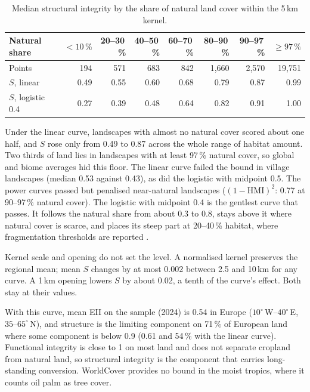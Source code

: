\documentclass[11pt,a4paper]{article}
\newcommand{\HMI}{\mathrm{HMI}}
\begin{document}
\begin{table}[H]
\centering\small
\caption{Median structural integrity by the share of natural land cover within the 5\,km kernel.}
\begin{tabular}{lrrrrrrr}
\toprule
Natural share & $<10\,\%$ & 20--30\,\% & 40--50\,\% & 60--70\,\% & 80--90\,\% & 90--97\,\% & $\ge 97\,\%$ \\
\midrule
Points & 194 & 571 & 683 & 842 & 1,660 & 2,570 & 19,751 \\
$S$, linear & 0.49 & 0.55 & 0.60 & 0.68 & 0.79 & 0.87 & 0.99 \\
$S$, logistic 0.4 & 0.27 & 0.39 & 0.48 & 0.64 & 0.82 & 0.91 & 1.00 \\
\bottomrule
\end{tabular}
\end{table}

Under the linear curve, landscapes with almost no natural cover scored about one half, and $S$ rose
only from 0.49 to 0.87 across the whole range of habitat amount. Two thirds of land lies in
landscapes with at least 97\,\% natural cover, so global and biome averages hid this floor. The
linear curve failed the bound in village landscapes (median 0.53 against 0.43), as did the
logistic with midpoint 0.5. The power curves passed but penalised near-natural landscapes
($(1-\HMI)^2$: 0.77 at 90--97\,\% natural cover). The logistic with midpoint 0.4 is the gentlest
curve that passes. It follows the natural share from about 0.3 to 0.8, stays above it where
natural cover is scarce, and places its steep part at 20--40\,\% habitat, where fragmentation
thresholds are reported \citep{andren1994,fahrig2003}.

Kernel scale and opening do not set the level. A normalised kernel preserves the regional mean;
mean $S$ changes by at most 0.002 between 2.5 and 10\,km for any curve. A 1\,km opening lowers
$S$ by about 0.02, a tenth of the curve's effect. Both stay at their \citet{beyer2020} values.

With this curve, mean EII on the sample (2024) is 0.54 in Europe ($10^\circ$\,W--$40^\circ$\,E,
$35$--$65^\circ$\,N), and structure is the limiting component on 71\,\% of European land where
some component is below 0.9 (0.61 and 54\,\% with the linear curve). Functional integrity is close
to 1 on most land and does not separate cropland from natural land, so structural integrity is
the component that carries long-standing conversion. WorldCover provides no bound in the moist
tropics, where it counts oil palm as tree cover.
\end{document}
